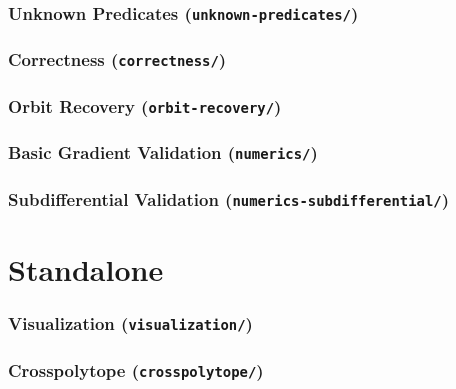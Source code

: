 \documentclass{article}
\begin{document}
\section{Unknown Predicates (\texttt{unknown-predicates/})}
\graphicspath{{dev-numerical-analysis/unknown-predicates/}}


\section{Correctness (\texttt{correctness/})}
\graphicspath{{dev-capacity-validation/correctness/}}


\section{Orbit Recovery (\texttt{orbit-recovery/})}
\graphicspath{{dev-capacity-validation/orbit-recovery/}}


\section{Basic Gradient Validation (\texttt{numerics/})}
\graphicspath{{dev-gradient/numerics/}}


\section{Subdifferential Validation (\texttt{numerics-subdifferential/})}
\graphicspath{{dev-gradient/numerics-subdifferential/}}


\part{Standalone}

\section{Visualization (\texttt{visualization/})}
\graphicspath{{visualization/}}


\section{Crosspolytope (\texttt{crosspolytope/})}
\graphicspath{{crosspolytope/}}


\printbibliography
\end{document}
